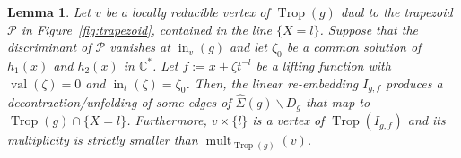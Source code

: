 \documentclass[11pt]{amsart}
\numberwithin{equation}{section}
\theoremstyle{plain}
\newtheorem{lemma}[theorem]{Lemma}
\theoremstyle{definition}
\theoremstyle{remark}
\begin{document}
\begin{lemma}\label{lm:VanishingDecontractsVertex}
  Let $v$ be a locally reducible vertex of $\operatorname{Trop}(g)$ dual to the
  trapezoid ${\mathcal{P}}$ in Figure~\ref{fig:trapezoid}, contained in the line
  $\{X=l\}$. Suppose that the discriminant of ${\mathcal{P}}$ vanishes at
  $\operatorname{in}_v(g)$ and let ${\zeta}_0$ be a common solution of $h_1(x)$ and
  $h_2(x)$ in ${\mathbb{C}}^*$.  Let $f:=x+{\zeta} t^{-l}$ be a lifting function
  with $\operatorname{val}({\zeta})=0$ and $\operatorname{in}_t({\zeta})={\zeta}_0$.  Then, the linear
  re-embedding $I_{g,f}$ produces a decontraction/unfolding of some
  edges of $\widehat{\Sigma}(g)\smallsetminus D_g$ that map to
  $\operatorname{Trop}(g)\cap \{X=l\}$. Furthermore, $v\times \{l\}$ is a vertex of
  $\operatorname{Trop}(I_{g,f})$ and its multiplicity is strictly smaller than
  $\operatorname{mult}_{\operatorname{Trop}(g)}(v)$.
\end{lemma}
\end{document}
